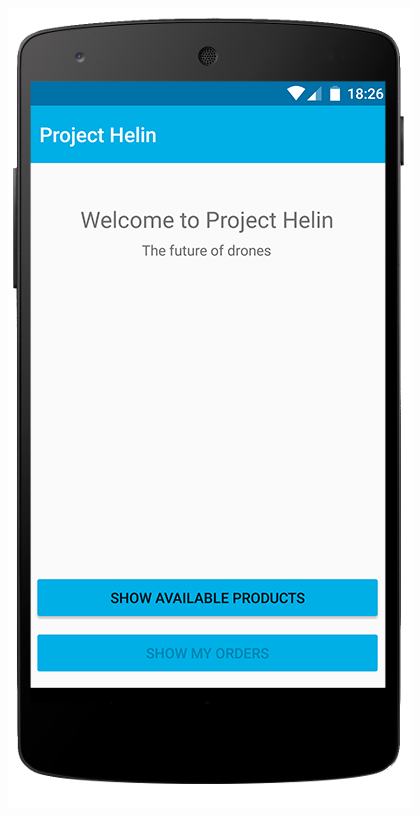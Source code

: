 \begin{figure}[H]
	\centering
	\begin{minipage}[b]{0.2\textwidth}
			\centering
		\includegraphics[width=\textwidth]{images/customer-app-android.png}
		\label{fig:customer-app-android}
	\end{minipage}

\end{figure}
